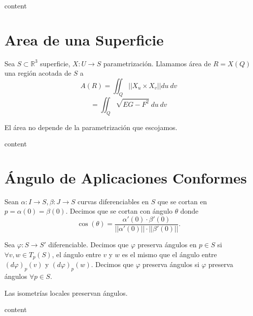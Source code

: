 \begin{dem}
  content
\end{dem}

\section{Area de una Superficie}

\begin{defn}
  Sea $S \subset \mathbb{R}^{3}$ superficie, $X : U \to S$ parametrización. Llamamos área de $R = X(Q)$ una región acotada de $S$ a
  \[ 
    A(R) = \iint_{Q}^{} ||X_{u} \times X_{v}|| du \ dv 
  \] 
  \[ 
    = \iint_{Q}^{} \sqrt{EG - F^{2}} \ du \ dv 
  \] 
\end{defn}

\begin{obs}
  El área no depende de la parametrización que escojamos.
\end{obs}

\begin{dem}
  content
\end{dem}

\section{Ángulo de Aplicaciones Conformes}

\begin{defn}
  Sean $\alpha : I \to S, \beta : J \to S$ curvas diferenciables en $S$ que se cortan en $p = \alpha(0) = \beta(0)$. Decimos que se cortan con ángulo $\theta$ donde
  \[ 
    \cos(\theta) = \frac{\alpha'(0) \cdot \beta'(0)}{||\alpha'(0)||\cdot ||\beta'(0)||}.
  \] 
\end{defn}

\begin{defn}
  Sea $\varphi : S \to S'$ diferenciable. Decimos que $\varphi$ preserva ángulos en $p \in S$ si $\forall v, w \in T_{p}(S)$, el ángulo entre $v$ y $w$ es el mismo que el ángulo entre $(d \varphi)_{p}(v)$ y $(d \varphi)_{p}(w)$. Decimos que $\varphi$ preserva ángulos si $\varphi$ preserva ángulos $\forall p \in S$.
\end{defn}

\begin{prop}
  Las isometrías locales preservan ángulos.
\end{prop}

\begin{dem}
  content
\end{dem}

